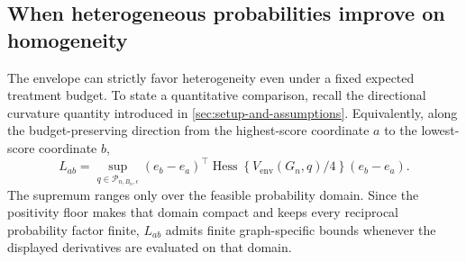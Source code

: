 \subsection{When heterogeneous probabilities improve on homogeneity}

The envelope can strictly favor heterogeneity even under a fixed expected treatment budget. To state a quantitative comparison, recall the directional curvature quantity introduced in \cref{sec:setup-and-assumptions}. Equivalently, along the budget-preserving direction from the highest-score coordinate \(a\) to the lowest-score coordinate \(b\),
\[
L_{ab}
=
\sup_{q\in\mathcal P_{n,B_n,\epsilon}}
(e_b-e_a)^\top
\operatorname{Hess}\!\left\{V_{\mathrm{env}}(G_n,q)/4\right\}
(e_b-e_a).
\]
The supremum ranges only over the feasible probability domain. Since the positivity floor makes that domain compact and keeps every reciprocal probability factor finite, \(L_{ab}\) admits finite graph-specific bounds whenever the displayed derivatives are evaluated on that domain.

